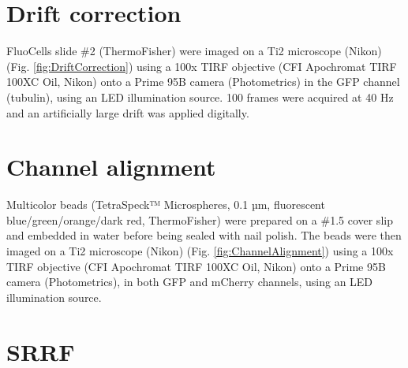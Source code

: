 

\onecolumn %
\fancyhead{} %
\renewcommand{\floatpagefraction}{0.1}
\lfoot[\bSupInf]{\dAuthor}
\rfoot[\dAuthor]{\cSupInf}
\newpage

\captionsetup*{format=largeformat} %
\setcounter{figure}{0} %
\setcounter{equation}{0} %
\setcounter{table}{0} %
\setcounter{page}{1} %
\makeatletter
\renewcommand{\thefigure}{S\@arabic\c@figure} %
\makeatother
\makeatletter
\renewcommand{\thetable}{S\@arabic\c@table} %
\makeatother
\makeatletter
\renewcommand{\theequation}{S\@arabic\c@equation} %
\makeatother




\tableofcontents

\newpage
\section{Drift correction}
FluoCells slide \#2 (ThermoFisher) were imaged on a Ti2 microscope (Nikon) (Fig. \ref{fig:DriftCorrection}) using a 100x TIRF objective (CFI Apochromat TIRF 100XC Oil, Nikon) onto a Prime 95B camera (Photometrics) in the GFP channel (tubulin), using an LED illumination source. 100 frames were acquired at 40 Hz and an artificially large drift was applied digitally.


\section{Channel alignment}

Multicolor beads (TetraSpeck™ Microspheres, 0.1 µm, fluorescent blue/green/orange/dark red, ThermoFisher) were prepared on a \#1.5 cover slip and embedded in water before being sealed with nail polish. The beads were then imaged on a Ti2 microscope (Nikon) (Fig. \ref{fig:ChannelAlignment}) using a 100x TIRF objective (CFI Apochromat TIRF 100XC Oil, Nikon) onto a Prime 95B camera (Photometrics), in both GFP and mCherry channels, using an LED illumination source. 

\section{SRRF}

